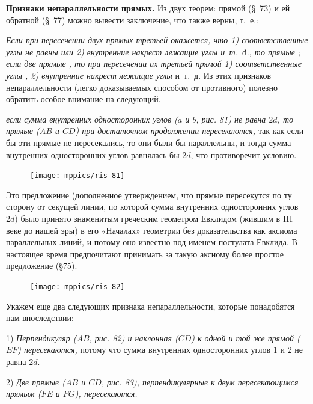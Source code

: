 \documentclass[oneside]{book}
\begin{document}
\textbf{Признаки непараллельности прямых.}
Из двух теорем:
прямой (§~73) и ей обратной (§~77) можно вывести заключение, что  также верны, т.~е.:

\emph{Если при пересечении двух прямых третьей окажется, что 1) соответственные углы не равны или 2) внутренние накрест лежащие углы  и~т.~д., то прямые ;
если две прямые , то при пересечении их третьей прямой 1) соответственные углы , 2) внутренние накрест лежащие углы } и~т.~д.
Из этих признаков непараллельности (легко доказываемых способом от противного) полезно обратить особое внимание на следующий.

\emph{если сумма внутренних односторонних углов \emph{($a$ и $b$, рис. 81)} не равна $2d$, то прямые \emph{($AB$ и $CD$)} при достаточном продолжении пересекаются,} так как если бы эти прямые не пересекались, то они были бы параллельны, и тогда сумма внутренних односторонних углов равнялась бы $2d$, что противоречит условию.

\begin{figure}
\centering
\texttt{[image: mppics/ris-81]}
\caption{}
\end{figure}

Это предложение (дополненное утверждением, что прямые пересекутся по ту сторону от секущей линии, по которой сумма внутренних односторонних углов  $2d$) было принято знаменитым греческим геометром Евклидом (жившим в III веке до нашей эры) в его «Началах» геометрии без доказательства как аксиома параллельных линий, и потому оно известно под именем постулата Евклида.
В настоящее время предпочитают принимать за такую аксиому более простое предложение (§75).

\begin{figure}
\centering
\texttt{[image: mppics/ris-82]}
\caption{}
\end{figure}

Укажем еще два следующих признака непараллельности, которые понадобятся нам впоследствии:

1) \emph{Перпендикуляр \emph{($AB$, рис. 82)} и наклонная \emph{($CD$)} к одной и той же прямой \emph{($EF$)} пересекаются,} потому что сумма внутренних односторонних углов 1 и 2 не равна $2d$.

2) \emph{Две прямые \emph{($AB$ и $CD$, рис. 83),} перпендикулярные к двум пересекающимся прямым \emph{($FE$ и $FG$),} пересекаются.}
\end{document}
